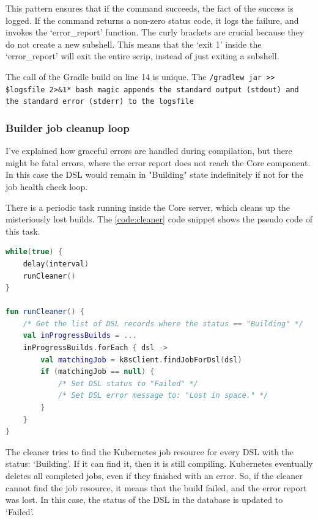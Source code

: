 This pattern ensures that if the command succeeds, the fact of the success is logged. If the command returns a non-zero status code, it logs the failure, and invokes the `error\_report' function. The curly brackets are crucial because they do not create a new subshell. This means that the `exit 1' inside the `error\_report' will exit the entire scrip, instead of just exiting a subshell.

The call of the Gradle build on line 14 is unique. The \lstinline*./gradlew jar >> $logsfile 2>&1* bash magic appends the standard output (stdout) and the standard error (stderr) to the logsfile.

\subsubsection{Builder job cleanup loop}

I've explained how graceful errors are handled during compilation, but there might be fatal errors, where the error report does not reach the Core component. In this case the DSL would remain in "Building" state indefinitely if not for the job health check loop.

There is a periodic task running inside the Core server, which cleans up the misteriously lost builds. The \ref{code:cleaner} code snippet shows the pseudo code of this task.

\begin{minipage}{\linewidth}
\begin{lstlisting}[caption={Job cleaner loop},language=Kotlin,label=code:cleaner]
while(true) {
    delay(interval)
    runCleaner()
}

fun runCleaner() {
    /* Get the list of DSL records where the status == "Building" */
    val inProgressBuilds = ...
    inProgressBuilds.forEach { dsl ->
        val matchingJob = k8sClient.findJobForDsl(dsl)
        if (matchingJob == null) {
            /* Set DSL status to "Failed" */
            /* Set DSL error message to: "Lost in space." */
        }
    }
}
\end{lstlisting}
\end{minipage}

The cleaner tries to find the Kubernetes job resource for every DSL with the status: `Building'. If it can find it, then it is still compiling. Kubernetes eventually deletes all completed jobs, even if they finished with an error. So, if the cleaner cannot find the job resource, it means that the build failed, and the error report was lost. In this case, the status of the DSL in the database is updated to `Failed'.

